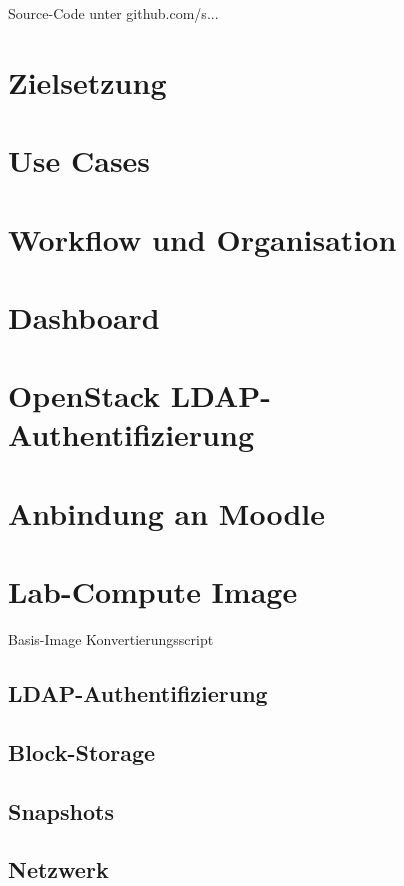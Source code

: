 Source-Code unter github.com/s...


\section{Zielsetzung}

\section{Use Cases}

\section{Workflow und Organisation}

\section{Dashboard}

\section{OpenStack LDAP-Authentifizierung}

\section{Anbindung an Moodle}

\section{Lab-Compute Image}

Basis-Image
Konvertierungsscript

\subsection{LDAP-Authentifizierung}

\subsection{Block-Storage}

\subsection{Snapshots}

\subsection{Netzwerk}

